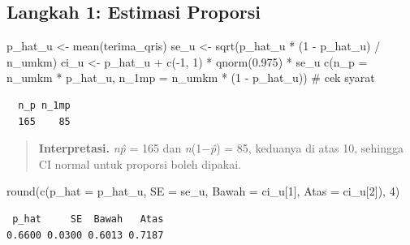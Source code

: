 \documentclass[
  indonesian,
  letterpaper,
]{book}
\newenvironment{Shaded}{\begin{snugshade}}{\end{snugshade}}
\newcommand{\AttributeTok}[1]{\textcolor[rgb]{0.40,0.45,0.13}{#1}}
\newcommand{\CommentTok}[1]{\textcolor[rgb]{0.37,0.37,0.37}{#1}}
\newcommand{\DecValTok}[1]{\textcolor[rgb]{0.68,0.00,0.00}{#1}}
\newcommand{\FloatTok}[1]{\textcolor[rgb]{0.68,0.00,0.00}{#1}}
\newcommand{\FunctionTok}[1]{\textcolor[rgb]{0.28,0.35,0.67}{#1}}
\newcommand{\NormalTok}[1]{\textcolor[rgb]{0.00,0.23,0.31}{#1}}
\newcommand{\OtherTok}[1]{\textcolor[rgb]{0.00,0.23,0.31}{#1}}
\newcommand{\SpecialCharTok}[1]{\textcolor[rgb]{0.37,0.37,0.37}{#1}}
\begin{document}
\subsection{Langkah 1: Estimasi
Proporsi}\label{langkah-1-estimasi-proporsi}

\begin{Shaded}
\begin{Highlighting}[]
\NormalTok{p\_hat\_u }\OtherTok{\textless{}{-}} \FunctionTok{mean}\NormalTok{(terima\_qris)}
\NormalTok{se\_u }\OtherTok{\textless{}{-}} \FunctionTok{sqrt}\NormalTok{(p\_hat\_u }\SpecialCharTok{*}\NormalTok{ (}\DecValTok{1} \SpecialCharTok{{-}}\NormalTok{ p\_hat\_u) }\SpecialCharTok{/}\NormalTok{ n\_umkm)}
\NormalTok{ci\_u }\OtherTok{\textless{}{-}}\NormalTok{ p\_hat\_u }\SpecialCharTok{+} \FunctionTok{c}\NormalTok{(}\SpecialCharTok{{-}}\DecValTok{1}\NormalTok{, }\DecValTok{1}\NormalTok{) }\SpecialCharTok{*} \FunctionTok{qnorm}\NormalTok{(}\FloatTok{0.975}\NormalTok{) }\SpecialCharTok{*}\NormalTok{ se\_u}
\FunctionTok{c}\NormalTok{(}\AttributeTok{n\_p =}\NormalTok{ n\_umkm }\SpecialCharTok{*}\NormalTok{ p\_hat\_u, }\AttributeTok{n\_1mp =}\NormalTok{ n\_umkm }\SpecialCharTok{*}\NormalTok{ (}\DecValTok{1} \SpecialCharTok{{-}}\NormalTok{ p\_hat\_u)) }\CommentTok{\# cek syarat}
\end{Highlighting}
\end{Shaded}

\begin{verbatim}
  n_p n_1mp 
  165    85 
\end{verbatim}

\begin{quote}
\textbf{Interpretasi.} \emph{np̂} = 165 dan \emph{n}(1−\emph{p̂}) = 85,
keduanya di atas 10, sehingga CI normal untuk proporsi boleh dipakai.
\end{quote}

\begin{Shaded}
\begin{Highlighting}[]
\FunctionTok{round}\NormalTok{(}\FunctionTok{c}\NormalTok{(}\AttributeTok{p\_hat =}\NormalTok{ p\_hat\_u, }\AttributeTok{SE =}\NormalTok{ se\_u, }\AttributeTok{Bawah =}\NormalTok{ ci\_u[}\DecValTok{1}\NormalTok{], }\AttributeTok{Atas =}\NormalTok{ ci\_u[}\DecValTok{2}\NormalTok{]), }\DecValTok{4}\NormalTok{)}
\end{Highlighting}
\end{Shaded}

\begin{verbatim}
 p_hat     SE  Bawah   Atas 
0.6600 0.0300 0.6013 0.7187 
\end{verbatim}
\end{document}
